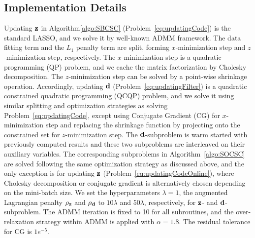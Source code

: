 \subsection{Implementation Details}
Updating $\code$ in Algorithm\ref{algo:SBCSC} (Problem~\ref{eq:updatingCode}) is the standard LASSO, and we solve it by well-known ADMM framework. The data fitting term and the $L_1$ penalty term are split, forming $x$-minimization step and $z$-minimization step, respectively. The $x$-minimization step is a quadratic programming (QP) problem, and we cache the matrix factorization by Cholesky decomposition. The $z$-minimization step can be solved by a point-wise shrinkage operation. Accordingly, updating $\filter$ (Problem~\ref{eq:updatingFilter}) is a quadratic constrained quadratic programming (QCQP) problem, and we solve it using similar splitting and optimization strategies as solving Problem~\ref{eq:updatingCode}, except using Conjugate Gradient (CG) for $x$-minimization step and replacing the shrinkage function by projecting onto the constrained set for $z$-minimization step. The $\filter$-subproblem is warm started with previously computed results and these two subproblems are interleaved on their auxiliary variables. The corresponding subproblems in Algorithm~\ref{algo:SOCSC} are solved following the same optimization strategy as discussed above, and the only exception is for updating $\code$ (Problem~\ref{eq:updatingCodeOnline}), where Cholesky decomposition or conjugate gradient is alternatively chosen depending on the mini-batch size. We set the hyperparameters $\lambda=1$,  the augmented Lagrangian penalty $\rho_{\code}$ and $\rho_{\filter}$ to $10 \lambda$ and $50 \lambda$, respectively, for $\code$- and $\filter$-subproblem. The ADMM iteration is fixed to 10 for all subroutines, and the over-relaxation strategy within ADMM is applied with $\alpha = 1.8$. The residual tolerance for CG is $1e^{-5}$.